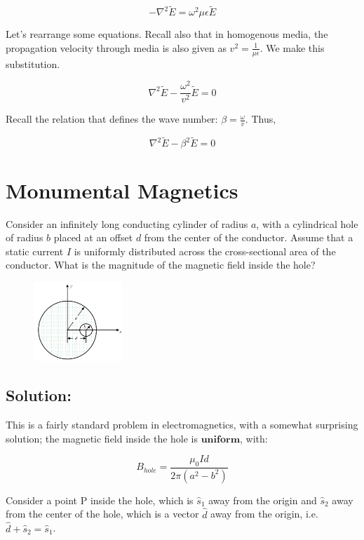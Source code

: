 \documentclass{article}
\begin{document}
$$- \nabla^2 \tilde{E} = \omega^2 \mu \epsilon \tilde{E}$$

Let's rearrange some equations. Recall also that in homogenous media, the propagation velocity through media is also given as $v^2 = \frac{1}{\mu \epsilon}$. We make this substitution.

$$\nabla^2 \tilde{E} - \frac{\omega^2}{v^2} \tilde{E} = 0$$

Recall the relation that defines the wave number: $\beta = \frac{\omega}{v}$. Thus,

$$\boxed{\nabla^2 \tilde{E} - \beta^2 \tilde{E} = 0}$$

\newpage

\section{Monumental Magnetics}

Consider an infinitely long conducting cylinder of radius $a$, with a cylindrical hole of radius $b$ placed at an offset $d$ from the center of the conductor. Assume that a static current $I$ is uniformly distributed across the cross-sectional area of the conductor. What is the magnitude of the magnetic field inside the hole?

\begin{figure}[H]
\begin{center}
    \includegraphics[width= 0.3\textwidth]{figures/cyl.png}
\end{center}
\end{figure}

\subsection{Solution:} This is a fairly standard problem in electromagnetics, with a somewhat surprising solution; the magnetic field inside the hole is $\textbf{uniform}$, with:

\[
B_{hole} = \frac{\mu_0 I d}{2\pi (a^2-b^2)}
\]

Consider a point P inside the hole, which is $\hat{s}_1$ away from the origin and $\hat{s}_2$ away from the center of the hole, which is a vector $\hat{d}$ away from the origin, i.e. $\hat{d} + \hat{s}_2 = \hat{s}_1$. 
\end{document}
